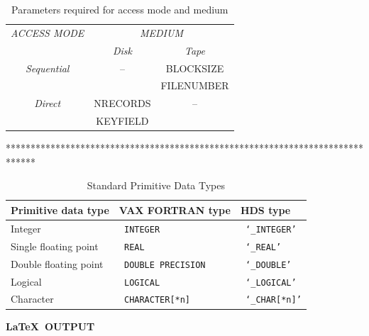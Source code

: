 \documentclass[twoside,11pt]{starlink}
\begin{document}
\begin{footnotesize}
\begin{terminalv}
\begin{table}
  \begin{center}
    \begin{tabular}{||c|c|c||} \hline
      \emph{ACCESS MODE} & \multicolumn{2}{c||}{\emph{MEDIUM}} \\ \cline{2-3}
      & \emph{Disk} & \emph{Tape} \\ \hline
      \emph{Sequential} & -- & BLOCKSIZE \\
      & & FILENUMBER \\ \hline
      \emph{Direct} & NRECORDS & -- \\
      & KEYFIELD & \\ \hline
    \end{tabular}
    \caption{Parameters required for access mode and medium}
  \end{center}
\end{table}

******************************************************************************

\begin{table}
  \begin{center}
    \begin{tabular}{||l|l|l||}
      \hline
      Primitive data type& VAX FORTRAN type	& HDS type \\
      \hline
      Integer			& \texttt{ INTEGER}	& \texttt{ `\_INTEGER'} \\
      Single floating point	& \texttt{ REAL}	& \texttt{ `\_REAL'} \\
      Double floating point& \texttt{ DOUBLE PRECISION} & \texttt{ `\_DOUBLE'} \\
      Logical	& \texttt{ LOGICAL}		& \texttt{ `\_LOGICAL'} \\
      Character	& \texttt{ CHARACTER[*n]}	& \texttt{ `\_CHAR[*n]'} \\
      \hline
    \end{tabular}
    \caption{Standard Primitive Data Types}
  \end{center}
\end{table}
\end{terminalv}
\end{footnotesize}

\newpage

\begin{center}
  \textbf{\LaTeX\ OUTPUT}
\end{center}
\end{document}
